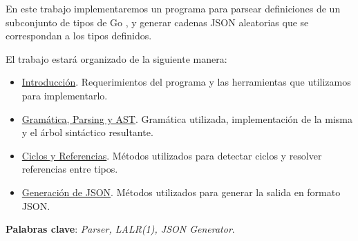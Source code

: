 {}


    En este trabajo implementaremos un programa para parsear definiciones de un subconjunto de tipos de Go \cite{Go}, y generar cadenas JSON \cite{JSON} aleatorias que se correspondan a los tipos definidos.

    El trabajo estará organizado de la siguiente manera:

\begin{itemize}
	\item \hyperlink{sec:intro}{Introducción}. Requerimientos del programa y las herramientas que utilizamos para implementarlo.
	\item \hyperlink{sec:gramatica}{Gramática, Parsing y AST}. Gramática utilizada, implementación de la misma y el árbol sintáctico resultante.
	\item \hyperlink{sec:referencias}{Ciclos y Referencias}. Métodos utilizados para detectar ciclos y resolver referencias entre tipos.
	\item \hyperlink{sec:json}{Generación de JSON}. Métodos utilizados para generar la salida en formato JSON.
\end{itemize}

\textbf{Palabras clave}: \textit{Parser, LALR(1), JSON Generator}.

